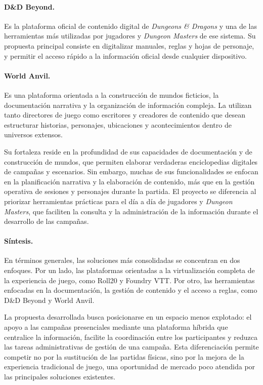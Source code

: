 \paragraph{D\&D Beyond.}
Es la plataforma oficial de contenido digital de \textit{Dungeons \& Dragons} y una de las herramientas más utilizadas por jugadores y \textit{Dungeon Masters} de ese sistema. Su propuesta principal consiste en digitalizar manuales, reglas y hojas de personaje, y permitir el acceso rápido a la información oficial desde cualquier dispositivo.

\paragraph{World Anvil.}
Es una plataforma orientada a la construcción de mundos ficticios, la documentación narrativa y la organización de información compleja. La utilizan tanto directores de juego como escritores y creadores de contenido que desean estructurar historias, personajes, ubicaciones y acontecimientos dentro de universos extensos.

Su fortaleza reside en la profundidad de sus capacidades de documentación y de construcción de mundos, que permiten elaborar verdaderas enciclopedias digitales de campañas y escenarios. Sin embargo, muchas de sus funcionalidades se enfocan en la planificación narrativa y la elaboración de contenido, más que en la gestión operativa de sesiones y personajes durante la partida. El proyecto se diferencia al priorizar herramientas prácticas para el día a día de jugadores y \textit{Dungeon Masters}, que faciliten la consulta y la administración de la información durante el desarrollo de las campañas.

\paragraph{Síntesis.}
En términos generales, las soluciones más consolidadas se concentran en dos enfoques. Por un lado, las plataformas orientadas a la virtualización completa de la experiencia de juego, como Roll20 y Foundry VTT. Por otro, las herramientas enfocadas en la documentación, la gestión de contenido y el acceso a reglas, como D\&D Beyond y World Anvil.

La propuesta desarrollada busca posicionarse en un espacio menos explotado: el apoyo a las campañas presenciales mediante una plataforma híbrida que centralice la información, facilite la coordinación entre los participantes y reduzca las tareas administrativas de gestión de una campaña. Esta diferenciación permite competir no por la sustitución de las partidas físicas, sino por la mejora de la experiencia tradicional de juego, una oportunidad de mercado poco atendida por las principales soluciones existentes.

